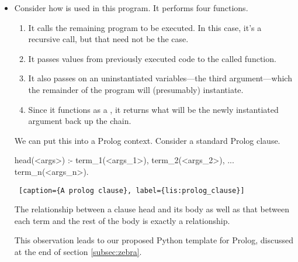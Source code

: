 \begin{itemize}
\item Consider how  is used in this program. It performs four functions.
\begin{enumerate}
    \item It calls the remaining program to be executed. In this case, it's a recursive call, but that need not be the case.
    \item It passes values from previously executed code to the called function. 
    \item It also passes on an uninstantiated variables---the third argument---which the remainder of the program will (presumably) instantiate.
    \item Since it functions as a , it returns what will be the newly instantiated argument back up the  chain.
\end{enumerate}
\smallv

We can put this into a Prolog context. Consider a standard Prolog clause.

\begin{minipage}{\linewidth} \largev \hrulefill
\begin{python}[numbers=left]
    head(<args>) :-
        term_1(<args_1>),
        term_2(<args_2>), 
        ...
        term_n(<args_n>).
\end{python}
\begin{lstlisting} [caption={A prolog clause}, label={lis:prolog_clause}]
\end{lstlisting}
\end{minipage}

The relationship between a clause head and its body as well as that between each term and the rest of the body is exactly a  relationship. 

This observation leads to our proposed Python template for Prolog, discussed at the end of section \ref{subsec:zebra}. 
\end{itemize}

\subsection{}


